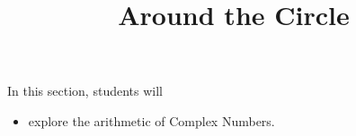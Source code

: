 \documentclass{ximera}
\title{Around the Circle}
\begin{document}
\begin{abstract}
\end{abstract}
\maketitle













\begin{sectionOutcomes}
In this section, students will 

\begin{itemize}
\item explore the arithmetic of Complex Numbers.
\end{itemize}
\end{sectionOutcomes}
\end{document}
